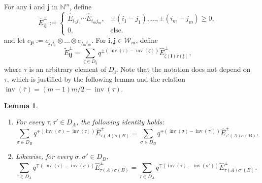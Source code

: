 \documentclass[pdftex]{sigma}
\numberwithin{equation}{section}
\newtheorem{Lemma}[Theorem]{Lemma}
\DeclareMathOperator{\inv}{inv}
\newcommand{\ii}{{\mathbf{i}}}
\newcommand{\jj}{{\mathbf{j}}}
\begin{document}
For any $ \ii $ and $ \jj $ in $ \mathbb{N}^m $, define
\[
\hat{E}^{\pm}_{\ii \jj} :=
\begin{cases}
\hat{E}_{i_1j_1}\cdots \hat{E}_{i_mj_m}, & \pm(i_1-j_1),\dots,\pm(i_m-j_m)\geq 0,\\
0, & \text{else}.
\end{cases}
\]
 and let $ e_{ \jj \ii }:= e_{j_1i_1} \otimes \dots \otimes e_{j_mi_m}$. For $\ii, \jj \in \mathcal{W}_m$, define
\[
\tilde{E}^{\pm}_{\ii\jj} =
\sum_{\zeta \in D_{\ii}}q^{\pm(\inv(\tau) -\inv(\zeta))}\hat{E}^{\pm}_{\bar{\zeta}(\ii)\bar{\tau}(\jj)},
\]
where $\tau$ is an arbitrary element of $D_{\jj}$. Note that the notation does not depend on $\tau$, which is justified by the following lemma and the relation $\inv(\bar{\tau}) = (m-1)m/2 - \inv(\tau)$.

\begin{Lemma} \label{prop 1}\quad
	\begin{enumerate}\itemsep=0pt
		\item[$1.$] For every $\tau,\tau' \in D_A$, the following identity holds: \begin{equation*}%
		\sum_{\sigma\in D_B} q^{\mp (\inv(\sigma)-\inv(\tau))} \hat{E}^{\pm}_{\tau(A) \sigma (B)} = \sum_{\sigma\in D_B} q^{\mp (\inv(\sigma)-\inv(\tau'))} \hat{E}^{\pm}_{\tau'(A) \sigma (B)} .
		\end{equation*} 	 	
		\item[$2.$] Likewise, for every $\sigma,\sigma' \in D_B$, \begin{equation*}%
		\sum_{\tau\in D_A} q^{\mp (\inv(\tau)-\inv(\sigma))} \hat{E}^{\pm}_{\tau(A) \sigma (B)} = \sum_{\tau\in D_A} q^{\mp (\inv(\tau)-\inv(\sigma'))} \hat{E}^{\pm}_{\tau(A) \sigma' (B)} .
		\end{equation*} 	 	
	\end{enumerate}
	\end{Lemma}
\end{document}
